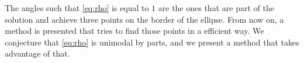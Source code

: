 The angles such that \autoref{eq:rho} is equal to $1$ are the ones that are part of the solution and achieve three points on the border of the ellipse. From now on, a method is presented that tries to find those points in a efficient way. We conjecture that \autoref{eq:rho} is unimodal by parts, and we present a method that takes advantage of that.

